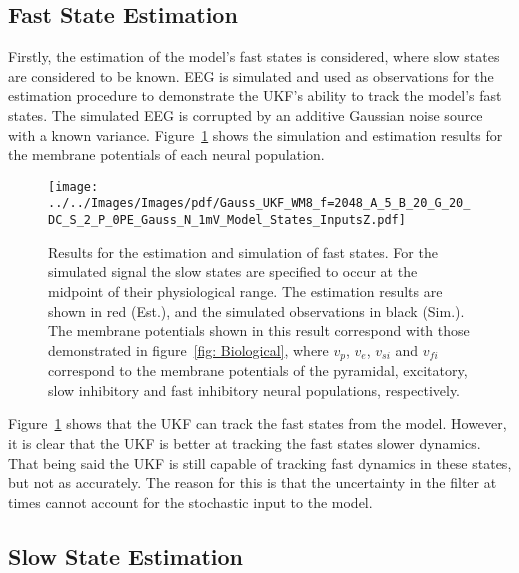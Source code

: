 \subsection{Fast State Estimation}
\label{ssec: MEstimation}

Firstly, the estimation of the model's fast states is considered, where slow states are considered to be known. EEG is simulated and used as observations for the estimation procedure to demonstrate the UKF's ability to track the model's fast states. The simulated EEG is corrupted by an additive Gaussian noise source with a known variance. Figure~\ref{fig: EstFSO} shows the simulation and estimation results for the membrane potentials of each neural population.
\begin{figure}%
	\centering
		\texttt{[image: ../../Images/Images/pdf/Gauss\_UKF\_WM8\_f=2048\_A\_5\_B\_20\_G\_20\_DC\_S\_2\_P\_0PE\_Gauss\_N\_1mV\_Model\_States\_InputsZ.pdf]}
	\caption{Results for the estimation and simulation of fast states. For the simulated signal the slow states are specified to occur at the midpoint of their physiological range. The estimation results are shown in red (Est.), and the simulated observations in black (Sim.). The membrane potentials shown in this result correspond with those demonstrated in figure~\ref{fig: Biological}, where $v_{p}$, $v_{e}$, $v_{si}$ and $v_{fi}$ correspond to the membrane potentials of the pyramidal, excitatory, slow inhibitory and fast inhibitory neural populations, respectively.}
	\label{fig: EstFSO}
\end{figure}%


Figure~\ref{fig: EstFSO} shows that the UKF can track the fast states from the model. However, it is clear that the UKF is better at tracking the fast states slower dynamics. That being said the UKF is still capable of tracking fast dynamics in these states, but not as accurately. The reason for this is that the uncertainty in the filter at times cannot account for the stochastic input to the model. 

\subsection{Slow State Estimation}
\label{ssec: SSEstimation}


